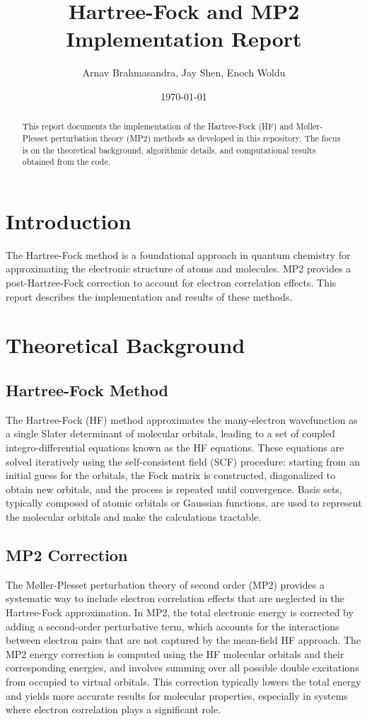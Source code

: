 \documentclass[12pt]{article}
\title{Hartree-Fock and MP2 Implementation Report}
\author{Arnav Brahmasandra, Jay Shen, Enoch Woldu}
\date{\today}
\begin{document}
\maketitle

\begin{abstract}
This report documents the implementation of the Hartree-Fock (HF) and Møller-Plesset perturbation theory (MP2) methods as developed in this repository. The focus is on the theoretical background, algorithmic details, and computational results obtained from the code.
\end{abstract}

\section{Introduction}
The Hartree-Fock method is a foundational approach in quantum chemistry for approximating the electronic structure of atoms and molecules. MP2 provides a post-Hartree-Fock correction to account for electron correlation effects. This report describes the implementation and results of these methods.

\section{Theoretical Background}
\subsection{Hartree-Fock Method}
The Hartree-Fock (HF) method approximates the many-electron wavefunction as a single Slater determinant of molecular orbitals, leading to a set of coupled integro-differential equations known as the HF equations. These equations are solved iteratively using the self-consistent field (SCF) procedure: starting from an initial guess for the orbitals, the Fock matrix is constructed, diagonalized to obtain new orbitals, and the process is repeated until convergence. Basis sets, typically composed of atomic orbitals or Gaussian functions, are used to represent the molecular orbitals and make the calculations tractable.

\subsection{MP2 Correction}
The Møller-Plesset perturbation theory of second order (MP2) provides a systematic way to include electron correlation effects that are neglected in the Hartree-Fock approximation. In MP2, the total electronic energy is corrected by adding a second-order perturbative term, which accounts for the interactions between electron pairs that are not captured by the mean-field HF approach. The MP2 energy correction is computed using the HF molecular orbitals and their corresponding energies, and involves summing over all possible double excitations from occupied to virtual orbitals. This correction typically lowers the total energy and yields more accurate results for molecular properties, especially in systems where electron correlation plays a significant role.
\end{document}
